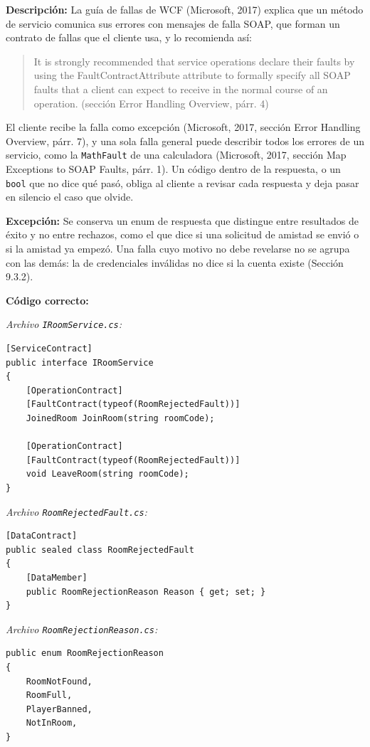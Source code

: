 \textbf{Descripción:} La guía de fallas de WCF (Microsoft, 2017) explica que un método de servicio comunica sus errores con mensajes de falla SOAP, que forman un contrato de fallas que el cliente usa, y lo recomienda así:
\begin{quote}
It is strongly recommended that service operations declare their faults by using the FaultContractAttribute attribute to formally specify all SOAP faults that a client can expect to receive in the normal course of an operation. (sección Error Handling Overview, párr. 4)
\end{quote}
\noindent El cliente recibe la falla como excepción (Microsoft, 2017, sección Error Handling Overview, párr. 7), y una sola falla general puede describir todos los errores de un servicio, como la \texttt{MathFault} de una calculadora (Microsoft, 2017, sección Map Exceptions to SOAP Faults, párr. 1). Un código dentro de la respuesta, o un \texttt{bool} que no dice qué pasó, obliga al cliente a revisar cada respuesta y deja pasar en silencio el caso que olvide.

\textbf{Excepción:} Se conserva un enum de respuesta que distingue entre resultados de éxito y no entre rechazos, como el que dice si una solicitud de amistad se envió o si la amistad ya empezó. Una falla cuyo motivo no debe revelarse no se agrupa con las demás: la de credenciales inválidas no dice si la cuenta existe (Sección 9.3.2).

\textbf{Código correcto:}

\textit{Archivo \texttt{IRoomService.cs}:}
\begin{lstlisting}[style=csharpstyle]
[ServiceContract]
public interface IRoomService
{
    [OperationContract]
    [FaultContract(typeof(RoomRejectedFault))]
    JoinedRoom JoinRoom(string roomCode);

    [OperationContract]
    [FaultContract(typeof(RoomRejectedFault))]
    void LeaveRoom(string roomCode);
}
\end{lstlisting}

\textit{Archivo \texttt{RoomRejectedFault.cs}:}
\begin{lstlisting}[style=csharpstyle]
[DataContract]
public sealed class RoomRejectedFault
{
    [DataMember]
    public RoomRejectionReason Reason { get; set; }
}
\end{lstlisting}

\textit{Archivo \texttt{RoomRejectionReason.cs}:}
\begin{lstlisting}[style=csharpstyle]
public enum RoomRejectionReason
{
    RoomNotFound,
    RoomFull,
    PlayerBanned,
    NotInRoom,
}
\end{lstlisting}

